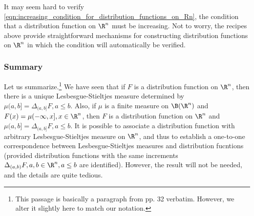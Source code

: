 \documentclass{article} %
\begin{document}

\begin{remark}

It may seem hard to verify \eqref{eqn:increasing_condition_for_distribution_functions_on_Rn}, the condition that a distribution function on $\R^n$ must be increasing.  Not to worry, the recipes above provide straightforward mechanisms for constructing distribution functions on $\R^n$ in which the condition will automatically be verified.
\end{remark}

\subsubsection{Summary}

Let us summarize.\footnote{This passage is basically a paragraph from \cite{ash2000probability} pp. 32 verbatim. However, we alter it slightly here to match our notation.} We have seen that if $F$ is a distribution function on $\R^n$, then there is a unique Lesbesgue-Stieltjes measure determined by $\mu(a,b] = \Delta_{(a,b]} F, a \leq b$.  Also, if $\mu$ is a finite measure on $\B(\R^n)$ and $F(x) = \mu(-\infty, x], x \in \R^n$, then $F$ is a distribution function on $\R^n$ and $\mu(a,b] =  \Delta_{(a,b]} F, a \leq b$.   It is possible to associate a distribution function with arbitrary Lesbesgue-Stieltjes measure on $\R^n$, and thus to establish a one-to-one correspondence between Lesbesgue-Stieltjes measures and distribution fucntions (provided distribution functions with the same increments $\Delta_{(a,b)} F, a,b \in \R^n, a \leq b$ are identified).  However, the result will not be needed, and the details are quite tedious. 


\end{document}

